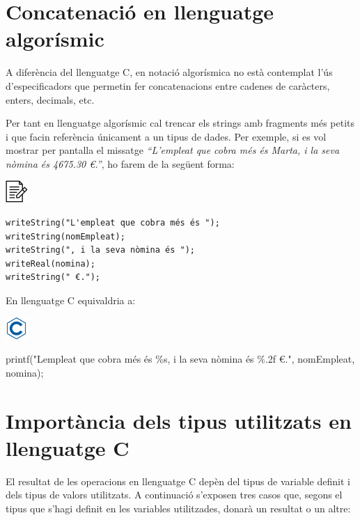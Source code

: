 \documentclass[
]{book}
\newenvironment{Shaded}{\begin{snugshade}}{\end{snugshade}}
\newcommand{\NormalTok}[1]{#1}
\newcommand{\StringTok}[1]{\textcolor[rgb]{0.31,0.60,0.02}{#1}}
\begin{document}
\hypertarget{concatenaciuxf3-en-llenguatge-algoruxedsmic}{%
\section{Concatenació en llenguatge algorísmic}\label{concatenaciuxf3-en-llenguatge-algoruxedsmic}}

A diferència del llenguatge C, en notació algorísmica no està contemplat l'ús d'especificadors que permetin fer concatenacions entre cadenes de caràcters, enters, decimals, etc.

Per tant en llenguatge algorísmic cal trencar els strings amb fragments més petits i que facin referència únicament a un tipus de dades. Per exemple, si es vol mostrar per pantalla el missatge \emph{``L'empleat que cobra més és Marta, i la seva nòmina és 4675.30 €.''}, ho farem de la següent forma:

\includegraphics{./img/alg.png}

\begin{verbatim}
writeString("L'empleat que cobra més és ");
writeString(nomEmpleat);
writeString(", i la seva nòmina és ");
writeReal(nomina);
writeString(" €.");
\end{verbatim}

En llenguatge C equivaldria a:

\includegraphics{./img/c.png}

\begin{Shaded}
\begin{Highlighting}[]
\NormalTok{printf(}\StringTok{"L\textquotesingle{}empleat que cobra més és \%s, i la seva nòmina és \%.2f €."}\NormalTok{, nomEmpleat, nomina);}
\end{Highlighting}
\end{Shaded}

\hypertarget{importuxe0ncia-dels-tipus-utilitzats-en-llenguatge-c}{%
\section{Importància dels tipus utilitzats en llenguatge C}\label{importuxe0ncia-dels-tipus-utilitzats-en-llenguatge-c}}

El resultat de les operacions en llenguatge C depèn del tipus de variable definit i dels tipus de valors utilitzats. A continuació s'exposen tres casos que, segons el tipus que s'hagi definit en les variables utilitzades, donarà un resultat o un altre:
\end{document}
